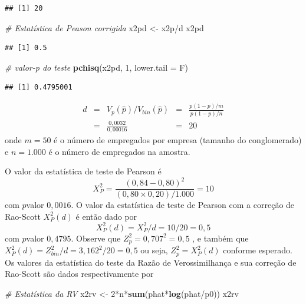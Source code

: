 \documentclass[]{book}
\newenvironment{Shaded}{\begin{snugshade}}{\end{snugshade}}
\newcommand{\KeywordTok}[1]{\textcolor[rgb]{0.13,0.29,0.53}{\textbf{{#1}}}}
\newcommand{\DataTypeTok}[1]{\textcolor[rgb]{0.13,0.29,0.53}{{#1}}}
\newcommand{\DecValTok}[1]{\textcolor[rgb]{0.00,0.00,0.81}{{#1}}}
\newcommand{\StringTok}[1]{\textcolor[rgb]{0.31,0.60,0.02}{{#1}}}
\newcommand{\CommentTok}[1]{\textcolor[rgb]{0.56,0.35,0.01}{\textit{{#1}}}}
\newcommand{\NormalTok}[1]{{#1}}
\numberwithin{example}{chapter}
\numberwithin{remark}{chapter}
\numberwithin{definition}{chapter}
\begin{document}
\begin{verbatim}
## [1] 20
\end{verbatim}

\begin{Shaded}
\begin{Highlighting}[]
\CommentTok{# Estatística de Peason corrigida}
\NormalTok{x2pd <-}\StringTok{ }\NormalTok{x2p/d}
\NormalTok{x2pd}
\end{Highlighting}
\end{Shaded}

\begin{verbatim}
## [1] 0.5
\end{verbatim}

\begin{Shaded}
\begin{Highlighting}[]
\CommentTok{# valor-p do teste}
\KeywordTok{pchisq}\NormalTok{(x2pd, }\DecValTok{1}\NormalTok{, }\DataTypeTok{lower.tail =} \NormalTok{F)}
\end{Highlighting}
\end{Shaded}

\begin{verbatim}
## [1] 0.4795001
\end{verbatim}

\[
\begin{array}{llcll}
d & = & V_{p}\left( \widehat{p}\right) /V_{bin}\left( \widehat{p}\right) & =
& \frac{p\left( 1-p\right) /m}{p\left( 1-p\right) /n} \\ 
& = & \frac{0,0032}{0,00016} & = & 20
\end{array}
\] onde \(m=50\) é o número de empregados por empresa (tamanho do
conglomerado) e \(n=1.000\) é o número de empregados na amostra.

O valor da estatística de teste de Pearson é \[
X_{P}^{2}=\frac{\left( 0,84-0,80\right) ^{2}}{\left( 0,80\times 0,20\right)
/1.000}=10 
\] com \(p\)valor \(0,0016\). O valor da estatística de teste de Pearson
com a correção de Rao-Scott \(X_{P}^{2}(d)\) é então dado por \[
X_{P}^{2}(d)=X_{P}^{2}/d=10/20=0,5 
\] com \(p\)valor \(0,4795\). Observe que \(Z_{p}^{2}=0,707^{2}=0,5\) ,
e também que \(X_{P}^{2}(d)=Z_{bin}^{2}/d= 3,162^{2}/20=0,5\) ou seja,
\(Z_{p}^{2}=X_{P}^{2}(d)\) conforme esperado. Os valores da estatística
do teste da Razão de Verossimilhança e sua correção de Rao-Scott são
dados respectivamente por

\begin{Shaded}
\begin{Highlighting}[]
\CommentTok{# Estatística da RV}
\NormalTok{x2rv <-}\StringTok{ }\DecValTok{2}\NormalTok{*n*}\KeywordTok{sum}\NormalTok{(phat*}\KeywordTok{log}\NormalTok{(phat/p0))}
\NormalTok{x2rv}
\end{Highlighting}
\end{Shaded}
\end{document}
